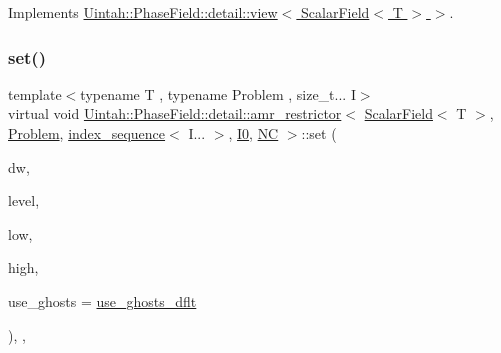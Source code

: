 Implements \hyperlink{classUintah_1_1PhaseField_1_1detail_1_1view_3_01ScalarField_3_01T_01_4_01_4_ae90ea8b33fde8515a1f2e8f5c03c0166}{Uintah\+::\+Phase\+Field\+::detail\+::view$<$ Scalar\+Field$<$ T $>$ $>$}.

\mbox{\label{classUintah_1_1PhaseField_1_1detail_1_1amr__restrictor_3_01ScalarField_3_01T_01_4_00_01Problem_05760ee5d1d3adcc969b3f56f71e72acb_a71f5fbbdd3e56e753d19c1d65f5c8467}} 
\subsubsection{\texorpdfstring{set()}{set()}\hspace{0.1cm}{\footnotesize\ttfamily [2/2]}}
{\footnotesize\ttfamily template$<$typename T , typename Problem , size\+\_\+t... I$>$ \\
virtual void \hyperlink{classUintah_1_1PhaseField_1_1detail_1_1amr__restrictor}{Uintah\+::\+Phase\+Field\+::detail\+::amr\+\_\+restrictor}$<$ \hyperlink{structUintah_1_1PhaseField_1_1ScalarField}{Scalar\+Field}$<$ T $>$, \hyperlink{classUintah_1_1PhaseField_1_1Problem}{Problem}, \hyperlink{namespaceUintah_1_1PhaseField_a237de804d99512e50613aff7c94a9461}{index\+\_\+sequence}$<$ I... $>$, \hyperlink{namespaceUintah_1_1PhaseField_a547ce3002aa97fbd3ef3192a6eec8406abdd8ebcbdfd71d1125937e3012dc45fb}{I0}, \hyperlink{namespaceUintah_1_1PhaseField_a33d355affda78a83f45755ba8388cedda77924170fe82bfd58b74ca3e44139718}{NC} $>$\+::set (\begin{DoxyParamCaption}\item[{Data\+Warehouse $\ast$}]{dw,  }\item[{const Level $\ast$}]{level,  }\item[{const Int\+Vector \&}]{low,  }\item[{const Int\+Vector \&}]{high,  }\item[{bool}]{use\+\_\+ghosts = {\ttfamily \hyperlink{classUintah_1_1PhaseField_1_1detail_1_1amr__restrictor_3_01ScalarField_3_01T_01_4_00_01Problem_05760ee5d1d3adcc969b3f56f71e72acb_a1579c120a731bc2c5e5d53a3e3db51dc}{use\+\_\+ghosts\+\_\+dflt}} }\end{DoxyParamCaption})\hspace{0.3cm}{\ttfamily [inline]}, {\ttfamily [override]}, {\ttfamily [virtual]}}



